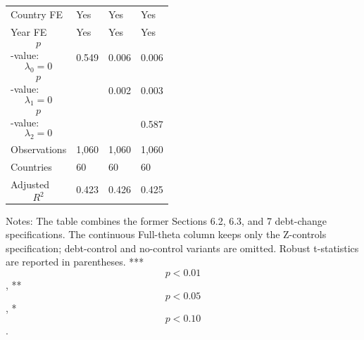 \begin{table}[H]
\begin{threeparttable}
\begin{tabularx}{\textwidth}{lYYY}
Country FE & Yes & Yes & Yes \\
Year FE & Yes & Yes & Yes \\
$$p$$-value: $$\lambda_0=0$$ & 0.549 & 0.006 & 0.006 \\
$$p$$-value: $$\lambda_1=0$$ &  & 0.002 & 0.003 \\
$$p$$-value: $$\lambda_2=0$$ &  &  & 0.587 \\
Observations & 1,060 & 1,060 & 1,060 \\
Countries & 60 & 60 & 60 \\
Adjusted $$R^2$$ & 0.423 & 0.426 & 0.425 \\
\bottomrule
\end{tabularx}
\begin{tablenotes}[flushleft]\footnotesize
\item Notes: The table combines the former Sections 6.2, 6.3, and 7 debt-change specifications. The continuous Full-theta column keeps only the Z-controls specification; debt-control and no-control variants are omitted. Robust t-statistics are reported in parentheses. *** $$p<0.01$$, ** $$p<0.05$$, * $$p<0.10$$.
\end{tablenotes}
\end{threeparttable}
\end{table}
